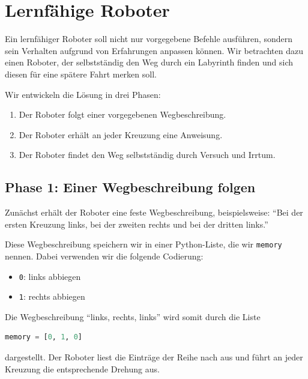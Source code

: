 \section{Lernfähige Roboter}

Ein lernfähiger Roboter soll nicht nur vorgegebene Befehle
ausführen, sondern sein Verhalten aufgrund von Erfahrungen
anpassen können. Wir betrachten dazu einen Roboter, der
selbstständig den Weg durch ein Labyrinth finden und sich
diesen für eine spätere Fahrt merken soll.

Wir entwickeln die Lösung in drei Phasen:
\begin{enumerate}
    \item Der Roboter folgt einer vorgegebenen Wegbeschreibung.
    \item Der Roboter erhält an jeder Kreuzung eine Anweisung.
    \item Der Roboter findet den Weg selbstständig durch
          Versuch und Irrtum.
\end{enumerate}

\subsection{Phase 1: Einer Wegbeschreibung folgen}

Zunächst erhält der Roboter eine feste Wegbeschreibung,
beispielsweise: \enquote{Bei der ersten Kreuzung links,
    bei der zweiten rechts und bei der dritten links.}

Diese Wegbeschreibung speichern wir in einer Python-Liste,
die wir \texttt{memory} nennen. Dabei verwenden wir
die folgende Codierung:
\begin{itemize}
    \item \texttt{0}: links abbiegen
    \item \texttt{1}: rechts abbiegen
\end{itemize}

Die Wegbeschreibung \enquote{links, rechts, links} wird
somit durch die Liste

\begin{lstlisting}[language=Python]
memory = [0, 1, 0]
\end{lstlisting}

dargestellt. Der Roboter liest die Einträge der Reihe
nach aus und führt an jeder Kreuzung die entsprechende
Drehung aus.

